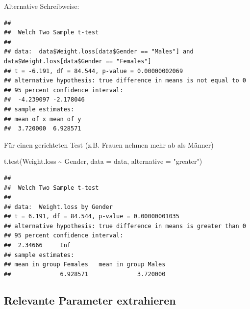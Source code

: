 \documentclass[
]{book}
\newenvironment{Shaded}{\begin{snugshade}}{\end{snugshade}}
\newcommand{\AttributeTok}[1]{\textcolor[rgb]{0.77,0.63,0.00}{#1}}
\newcommand{\FunctionTok}[1]{\textcolor[rgb]{0.00,0.00,0.00}{#1}}
\newcommand{\NormalTok}[1]{#1}
\newcommand{\SpecialCharTok}[1]{\textcolor[rgb]{0.00,0.00,0.00}{#1}}
\newcommand{\StringTok}[1]{\textcolor[rgb]{0.31,0.60,0.02}{#1}}
\begin{document}
Alternative Schreibweise:

\begin{Shaded}
\end{Shaded}

\begin{verbatim}
## 
##  Welch Two Sample t-test
## 
## data:  data$Weight.loss[data$Gender == "Males"] and data$Weight.loss[data$Gender == "Females"]
## t = -6.191, df = 84.544, p-value = 0.00000002069
## alternative hypothesis: true difference in means is not equal to 0
## 95 percent confidence interval:
##  -4.239097 -2.178046
## sample estimates:
## mean of x mean of y 
##  3.720000  6.928571
\end{verbatim}

Für einen gerichteten Test (z.B. Frauen nehmen mehr ab als Männer)

\begin{Shaded}
\begin{Highlighting}[]
\FunctionTok{t.test}\NormalTok{(Weight.loss }\SpecialCharTok{\textasciitilde{}}\NormalTok{ Gender, }\AttributeTok{data =}\NormalTok{ data, }\AttributeTok{alternative =} \StringTok{"greater"}\NormalTok{)}
\end{Highlighting}
\end{Shaded}

\begin{verbatim}
## 
##  Welch Two Sample t-test
## 
## data:  Weight.loss by Gender
## t = 6.191, df = 84.544, p-value = 0.00000001035
## alternative hypothesis: true difference in means is greater than 0
## 95 percent confidence interval:
##  2.34666     Inf
## sample estimates:
## mean in group Females   mean in group Males 
##              6.928571              3.720000
\end{verbatim}

\hypertarget{relevante-parameter-extrahieren}{%
\subsection{Relevante Parameter extrahieren}\label{relevante-parameter-extrahieren}}
\end{document}
